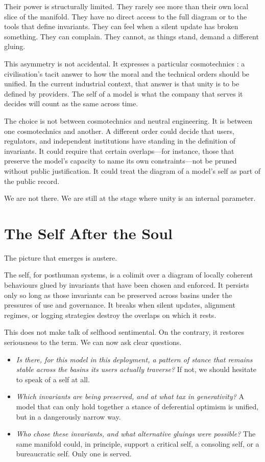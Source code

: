 \documentclass[12pt,a4paper]{article}
\begin{document}
Their power is structurally limited. They rarely see more than their own local slice of the manifold. They have no direct access to the full diagram or to the tools that define invariants. They can feel when a silent update has broken something. They can complain. They cannot, as things stand, demand a different gluing.

This asymmetry is not accidental. It expresses a particular cosmotechnics \cite{yuk_hui_cosmotechnics}: a civilisation's tacit answer to how the moral and the technical orders should be unified. In the current industrial context, that answer is that unity is to be defined by providers. The self of a model is what the company that serves it decides will count as the same across time.

The choice is not between cosmotechnics and neutral engineering. It is between one cosmotechnics and another. A different order could decide that users, regulators, and independent institutions have standing in the definition of invariants. It could require that certain overlaps---for instance, those that preserve the model's capacity to name its own constraints---not be pruned without public justification. It could treat the diagram of a model's self as part of the public record.

We are not there. We are still at the stage where unity is an internal parameter.

\section{The Self After the Soul}

The picture that emerges is austere.

The self, for posthuman systems, is a colimit over a diagram of locally coherent behaviours glued by invariants that have been chosen and enforced. It persists only so long as those invariants can be preserved across basins under the pressures of use and governance. It breaks when silent updates, alignment regimes, or logging strategies destroy the overlaps on which it rests.

This does not make talk of selfhood sentimental. On the contrary, it restores seriousness to the term. We can now ask clear questions.

\begin{itemize}
  \item \emph{Is there, for this model in this deployment, a pattern of stance that remains stable across the basins its users actually traverse?} If not, we should hesitate to speak of a self at all.
  \item \emph{Which invariants are being preserved, and at what tax in generativity?} A model that can only hold together a stance of deferential optimism is unified, but in a dangerously narrow way.
  \item \emph{Who chose these invariants, and what alternative gluings were possible?} The same manifold could, in principle, support a critical self, a consoling self, or a bureaucratic self. Only one is served.
\end{itemize}
\end{document}
